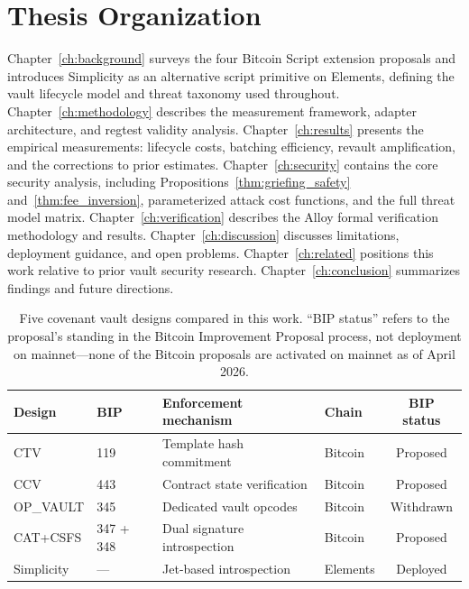 \section{Thesis Organization} \label{se:organization}

Chapter~\ref{ch:background} surveys the four Bitcoin Script extension proposals and
introduces Simplicity as an alternative script primitive on Elements, defining the
vault lifecycle model and threat taxonomy used throughout.
Chapter~\ref{ch:methodology} describes the measurement framework, adapter architecture,
and regtest validity analysis. Chapter~\ref{ch:results} presents the empirical
measurements: lifecycle costs, batching efficiency, revault amplification, and the
corrections to prior estimates. Chapter~\ref{ch:security} contains the core security
analysis, including Propositions~\ref{thm:griefing_safety}
and~\ref{thm:fee_inversion},
parameterized attack cost functions, and the full threat model matrix.
Chapter~\ref{ch:verification} describes the Alloy formal verification methodology and
results. Chapter~\ref{ch:discussion} discusses limitations, deployment guidance, and
open problems. Chapter~\ref{ch:related} positions this work relative to prior vault
security research. Chapter~\ref{ch:conclusion} summarizes findings and future directions.

\begin{table}[t]
\centering
\caption{Five covenant vault designs compared in this work. ``BIP status'' refers
to the proposal's standing in the Bitcoin Improvement Proposal process, not
deployment on mainnet---none of the Bitcoin proposals are activated on mainnet
as of April 2026.}
\label{tab:designs_overview}
\begin{tabular}{@{}llllc@{}}
\toprule
Design & BIP & Enforcement mechanism & Chain & BIP status \\
\midrule
CTV        & 119       & Template hash commitment   & Bitcoin  & Proposed \\
CCV        & 443       & Contract state verification & Bitcoin  & Proposed \\
OP\_VAULT  & 345       & Dedicated vault opcodes     & Bitcoin  & Withdrawn \\
CAT+CSFS   & 347 + 348 & Dual signature introspection & Bitcoin & Proposed \\
Simplicity & ---       & Jet-based introspection     & Elements & Deployed \\
\bottomrule
\end{tabular}
\end{table}
